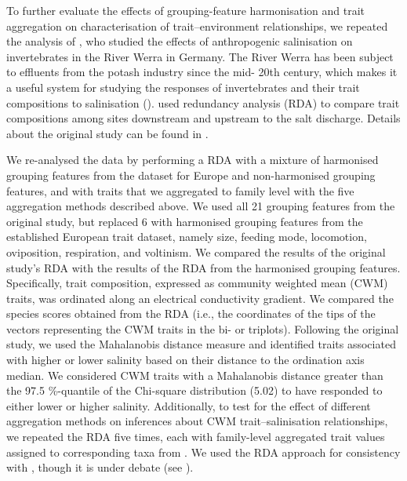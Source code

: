 \documentclass[12pt]{article}
\begin{document}
To further evaluate the effects of grouping-feature harmonisation and trait aggregation on characterisation of trait–environment relationships, we repeated the analysis of \citet{szocs_effects_2014}, who studied the effects of anthropogenic salinisation on invertebrates in the River Werra in Germany. The River Werra has been subject to effluents from the potash industry since the mid- 20th century, which makes it a useful system for studying the responses of invertebrates and their trait compositions to salinisation (\cite{bathe_biological_2011}). \citet{szocs_effects_2014} used redundancy analysis (RDA) to compare trait compositions among sites downstream and upstream to the salt discharge. Details about the original study can be found in \citet{szocs_effects_2014}.

We re-analysed the \citet{szocs_effects_2014} data by performing a RDA with a mixture of harmonised grouping features from the dataset for Europe and non-harmonised grouping features, and with traits that we aggregated to family level with the five aggregation methods described above. We used all 21 grouping features from the original study, but replaced 6 with harmonised grouping features from the established European trait dataset, namely size, feeding mode, locomotion, oviposition, respiration, and voltinism.
We compared the results of the original study’s RDA with the results of the RDA from the harmonised grouping features. Specifically, trait composition, expressed as community weighted mean (CWM) traits, was ordinated along an electrical conductivity gradient. We compared the species scores obtained from the RDA (i.e., the coordinates of the tips of the vectors representing the CWM traits in the bi- or triplots). Following the original study, we used the Mahalanobis distance measure and identified traits associated with higher or lower salinity based on their distance to the ordination axis median. We considered CWM traits with a Mahalanobis distance greater than the 97.5 \%-quantile of the Chi-square distribution (5.02) to have responded to either lower or higher salinity. Additionally, to test for the effect of different aggregation methods on inferences about CWM trait–salinisation relationships, we repeated the RDA five times, each with family-level aggregated trait values assigned to corresponding taxa from \citet{szocs_effects_2014}. We used the RDA approach for consistency with \citet{szocs_effects_2014}, though it is under debate (see \citet{peres-netoLinkingTraitVariation2017, millerFunctionalTraitsCommunity2019}).
\end{document}

